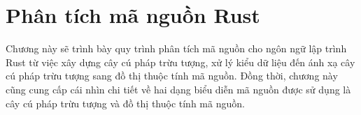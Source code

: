 \chapter{Phân tích mã nguồn Rust}
\label{chap:method}

Chương này sẽ trình bày quy trình phân tích mã nguồn cho ngôn ngữ lập trình Rust từ việc xây dựng cây cú pháp trừu tượng, xử lý kiểu dữ liệu đến ánh xạ cây cú pháp trừu tượng sang đồ thị thuộc tính mã nguồn. Đồng thời, chương này cũng cung cấp cái nhìn chi tiết về hai dạng biểu diễn mã nguồn được sử dụng là cây cú pháp trừu tượng và đồ thị thuộc tính mã nguồn.






